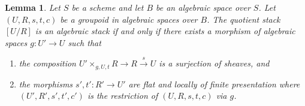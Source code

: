 \documentclass{stacks-project}
\theoremstyle{plain}
\newtheorem{lemma}[subsection]{Lemma}
\theoremstyle{definition}
\theoremstyle{remark}
\numberwithin{equation}{subsection}
\begin{document}
\begin{lemma}
\label{lemma-quotient-algebraic}
Let $S$ be a scheme and let $B$ be an algebraic space over $S$.
Let $(U, R, s, t, c)$ be a groupoid in algebraic spaces over $B$.
The quotient stack $[U/R]$ is an algebraic stack if and only if
there exists a morphism of algebraic spaces $g : U' \to U$ such that
\begin{enumerate}
\item the composition
$U' \times_{g, U, t} R \to R \xrightarrow{s} U$ is a surjection of
sheaves, and
\item the morphisms $s', t' : R' \to U'$ are flat and locally of finite
presentation where $(U', R', s', t', c')$ is the restriction of
$(U, R, s, t, c)$ via $g$.
\end{enumerate}
\end{lemma}
\end{document}
